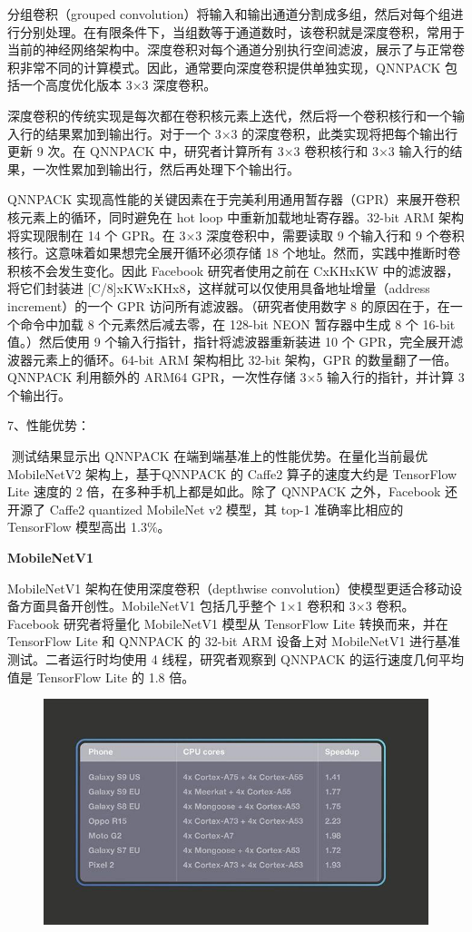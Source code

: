 分组卷积（grouped
convolution）将输入和输出通道分割成多组，然后对每个组进行分别处理。在有限条件下，当组数等于通道数时，该卷积就是深度卷积，常用于当前的神经网络架构中。深度卷积对每个通道分别执行空间滤波，展示了与正常卷积非常不同的计算模式。因此，通常要向深度卷积提供单独实现，QNNPACK
包括一个高度优化版本 3×3 深度卷积。

深度卷积的传统实现是每次都在卷积核元素上迭代，然后将一个卷积核行和一个输入行的结果累加到输出行。对于一个
3×3 的深度卷积，此类实现将把每个输出行更新 9 次。在 QNNPACK
中，研究者计算所有 3×3 卷积核行和 3×3
输入行的结果，一次性累加到输出行，然后再处理下个输出行。

QNNPACK
实现高性能的关键因素在于完美利用通用暂存器（GPR）来展开卷积核元素上的循环，同时避免在
hot loop 中重新加载地址寄存器。32-bit ARM 架构将实现限制在 14 个 GPR。在
3×3 深度卷积中，需要读取 9 个输入行和 9
个卷积核行。这意味着如果想完全展开循环必须存储 18
个地址。然而，实践中推断时卷积核不会发生变化。因此 Facebook
研究者使用之前在 CxKHxKW 中的滤波器，将它们封装进
{[}C/8{]}xKWxKHx8，这样就可以仅使用具备地址增量（address
increment）的一个 GPR 访问所有滤波器。（研究者使用数字 8
的原因在于，在一个命令中加载 8 个元素然后减去零，在 128-bit NEON
暂存器中生成 8 个 16-bit 值。）然后使用 9
个输入行指针，指针将滤波器重新装进 10 个
GPR，完全展开滤波器元素上的循环。64-bit ARM 架构相比 32-bit 架构，GPR
的数量翻了一倍。QNNPACK 利用额外的 ARM64 GPR，一次性存储 3×5
输入行的指针，并计算 3 个输出行。

7、性能优势：

​ 测试结果显示出 QNNPACK 在端到端基准上的性能优势。在量化当前最优
MobileNetV2 架构上，基于QNNPACK 的 Caffe2 算子的速度大约是 TensorFlow
Lite 速度的 2 倍，在多种手机上都是如此。除了 QNNPACK 之外，Facebook
还开源了 Caffe2 quantized MobileNet v2 模型，其 top-1 准确率比相应的
TensorFlow 模型高出 1.3\%。

\textbf{MobileNetV1}

MobileNetV1 架构在使用深度卷积（depthwise
convolution）使模型更适合移动设备方面具备开创性。MobileNetV1
包括几乎整个 1×1 卷积和 3×3 卷积。Facebook 研究者将量化 MobileNetV1
模型从 TensorFlow Lite 转换而来，并在 TensorFlow Lite 和 QNNPACK 的
32-bit ARM 设备上对 MobileNetV1 进行基准测试。二者运行时均使用 4
线程，研究者观察到 QNNPACK 的运行速度几何平均值是 TensorFlow Lite 的 1.8
倍。

\begin{figure}
\centering
\includegraphics{./img/ch17/mv1.jpg}
\caption{}
\end{figure}


